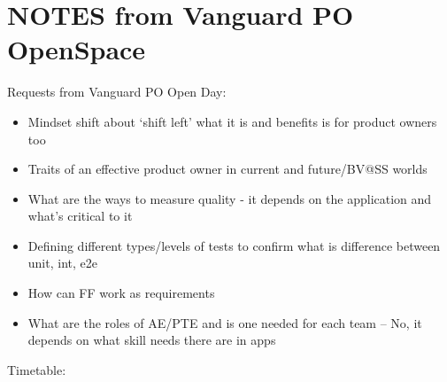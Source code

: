 \ifnotes
    \chapter*{NOTES from Vanguard PO OpenSpace}
    
    Requests from Vanguard PO Open Day:
    \begin{itemize}
        \item Mindset shift about ‘shift left’ what it is and benefits is for product owners too
        \item Traits of an effective product owner in current and future/BV@SS worlds
        \item What are the ways to measure quality - it depends on the application and what’s critical to it
        \item Defining different types/levels of tests to confirm what is difference between unit, int, e2e
        \item How can FF work as requirements
        \item What are the roles of AE/PTE and is one needed for each team – No, it depends on what skill needs there are in apps
    \end{itemize}
    
    
    Timetable:
    
